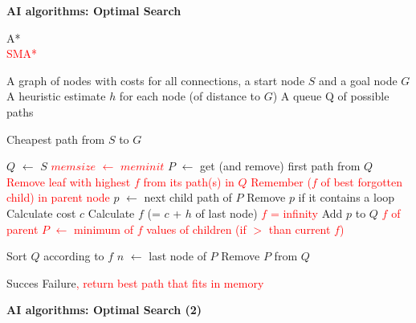 \documentclass[11pt] {article}
\newcommand{\algorithmicinput}{\textbf{Input:}}
\newcommand{\algorithmicoutput}{\textbf{Output:}}
\newcommand{\INPUT}{\item[\algorithmicinput]}
\newcommand{\OUTPUT}{\item[\algorithmicoutput]}
\newcommand{\algorithmicalgo}{\textbf{Algorithm:}}
\newcommand{\ALGO}{\item[\algorithmicalgo]}
\begin{document}
\pagestyle{empty}


\begin{center}
\LARGE
\textbf{AI algorithms: Optimal Search}\\
\end{center}
\vspace{1cm}

\noindent \large{A*}\\
\textcolor{red}{\large{SMA*}}\\

\begin{algorithmic}
\INPUT
\STATE A graph of nodes with costs for all connections, a start node $S$ and a goal node $G$
\STATE A heuristic estimate $h$ for each node (of distance to $G$)
\STATE A queue Q of possible paths

\OUTPUT 
\STATE Cheapest path from $S$ to $G$
\end{algorithmic}
\begin{algorithmic}
\ALGO
\STATE $Q$ $\leftarrow$ $S$
\STATE \textcolor{red}{$memsize$ $\leftarrow$ $meminit$}
\STATE $P$ $\leftarrow$ get (and remove) first path from $Q$
\STATE \vspace{-0.5cm}
\textcolor{red}{
\STATE Remove leaf with highest $f$ from its path(s) in $Q$ 
\STATE Remember ($f$ of best forgotten child) in parent node
\ENDIF
}
\STATE $p$ $\leftarrow$ next child path of $P$
\STATE Remove $p$ if it contains a loop
\STATE Calculate cost $c$
\STATE Calculate $f$ (= $c$ + $h$ of last node)
\textcolor{red}{
\STATE $f$ = infinity
\ENDIF
}
\STATE Add $p$ to $Q$
\ENDWHILE
\STATE \textcolor{red}{$f$ of parent $P$ $\leftarrow$ minimum of $f$ values of children (if $>$ than current $f$)}

\STATE Sort $Q$ according to $f$
\STATE $n$ $\leftarrow$ last node of $P$
\STATE Remove $P$ from $Q$
\ENDIF
\ENDFOR

\ENDWHILE
{}
\STATE Succes
\ELSE
\STATE Failure\textcolor{red}{, return best path that fits in memory}
\ENDIF
\end{algorithmic}
\clearpage
\begin{center}
\LARGE
\textbf{AI algorithms: Optimal Search (2)}\\
\end{center}
\vspace{1cm}
\end{document}

